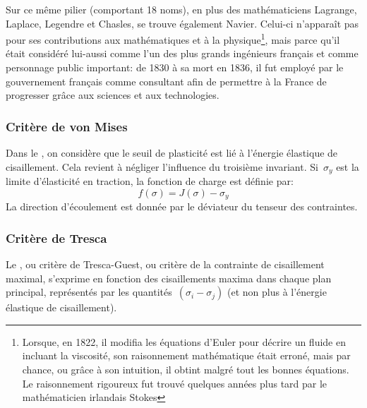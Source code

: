 \begin{histoire}
\medskip
Sur ce même pilier (comportant 18 noms), en plus des mathématiciens Lagrange, Laplace, Legendre et Chasles, se trouve également Navier. Celui-ci n'apparaît pas pour ses contributions aux mathématiques et à la physique\footnote{Lorsque, en 1822, il modifia les équations d'Euler pour décrire un fluide en incluant la viscosité, son raisonnement mathématique était erroné, mais par chance, ou grâce à son intuition, il obtint malgré tout les bonnes équations. Le raisonnement rigoureux fut trouvé quelques années plus tard par le mathématicien irlandais Stokes}, mais parce qu'il était considéré lui-aussi comme l'un des plus grands ingénieurs français et comme personnage public important: de 1830 à sa mort en 1836, il fut employé par le gouvernement français comme consultant afin de permettre à la France de progresser grâce aux sciences et aux technologies.
\end{histoire}


\medskip
\subsubsection{Critère de von Mises}

Dans le , on considère que le seuil de plasticité est lié à l'énergie élastique de cisaillement. Cela revient à négliger l'influence du troisième invariant. Si~$\sigma_y$ est la limite d'élasticité en traction, la fonction de charge est définie par:
\begin{equation} f(\sigma) = J(\sigma) - \sigma_y \end{equation} La direction d'écoulement est donnée par le déviateur du tenseur des contraintes.

\medskip
\subsubsection{Critère de Tresca}

Le ,  ou critère de Tresca-Guest, ou critère de la contrainte de cisaillement maximal, s'exprime en fonction des cisaillements maxima dans chaque plan principal, représentés par les quantités~$(\sigma_i-\sigma_j)$ (et non plus à l'énergie élastique de cisaillement).

